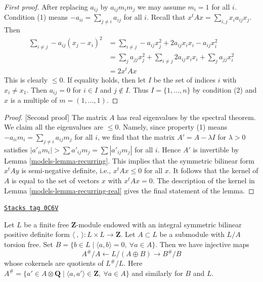 \begin{proof}[First proof]
After replacing $a_{ij}$ by $a_{ij}m_im_j$ we may assume $m_i = 1$
for all $i$. Condition (1) means $-a_{ii} = \sum_{j \not = i} a_{ij}$
for all $i$. Recall that $x^tAx = \sum_{i, j} x_ia_{ij}x_j$.
Then
\begin{align*}
\sum\nolimits_{i \not = j} -a_{ij}(x_j - x_i)^2 & =
\sum\nolimits_{i \not = j} -a_{ij}x_j^2 + 2a_{ij}x_ix_i - a_{ij}x_i^2 \\
& =
\sum\nolimits_j a_{jj} x_j^2 +
\sum\nolimits_{i \not = j} 2a_{ij}x_ix_i +
\sum\nolimits_j a_{jj} x_i^2 \\
& = 2x^tAx
\end{align*}
This is clearly $\leq 0$. If equality holds, then let $I$ be the set
of indices $i$ with $x_i \not = x_1$. Then $a_{ij} = 0$ for $i \in I$
and $j \not \in I$. Thus $I = \{1, \ldots, n\}$ by condition (2) and
$x$ is a multiple of $m = (1, \ldots, 1)$.
\end{proof}

\begin{proof}
[Second proof]
The matrix $A$ has real eigenvalues by the spectral theorem.
We claim all the eigenvalues are $\leq 0$.
Namely, since property (1) means
$-a_{ii}m_i = \sum_{j \not = i} a_{ij}m_j$ for all $i$,
we find that the matrix $A' = A - \lambda I$ for $\lambda > 0$
satisfies $|a'_{ii}m_i| > \sum a'_{ij}m_j = \sum |a'_{ij}m_j|$ for all $i$.
Hence $A'$ is invertible by Lemma \ref{models-lemma-recurring}.
This implies that the symmetric bilinear form $x^tAy$
is semi-negative definite, i.e., $x^tAx \leq 0$ for all $x$.
It follows that the kernel of $A$ is equal
to the set of vectors $x$ with $x^tAx = 0$.
The description of the kernel in Lemma \ref{models-lemma-recurring-real}
gives the final statement of the lemma.
\end{proof}

\begin{lemma}
\label{models-lemma-orthogonal-direct-sum}
\href{https://stacks.math.columbia.edu/tag/0C6V}{\texttt{Stacks tag 0C6V}}

Let $L$ be a finite free $\mathbf{Z}$-module endowed
with an integral symmetric bilinear positive definite
form $\langle\ ,\ \rangle : L \times L \to \mathbf{Z}$.
Let $A \subset L$ be a submodule with $L/A$ torsion free. Set
$B = \{b \in L \mid \langle a, b\rangle = 0,\ \forall a \in A\}$.
Then we have injective maps
$$
A^\#/A \leftarrow L/(A \oplus B) \rightarrow B^\#/B
$$
whose cokernels are quotients of $L^\#/L$. Here
$A^\# = \{a' \in A \otimes \mathbf{Q} \mid
\langle a, a'\rangle \in \mathbf{Z},\ \forall a \in A\}$
and similarly for $B$ and $L$.
\end{lemma}

